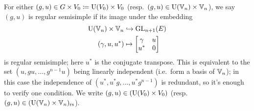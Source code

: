 \begin{definition}
\begin{itemize}
    \ii For either $(g,u) \in G \times V_0 \coloneqq \operatorname{U}(V_0) \times V_0$
    (resp.\ $(g, u) \in \operatorname{U}(\mathbb V_n) \times \mathbb V_n$),
    we say $(g, u)$
    is regular semisimple if its image under the embedding
    \begin{equation}
      \begin{aligned}
        \operatorname{U}(\mathbb V_n) \times \mathbb V_n &\hookrightarrow \operatorname{GL}_{n+1}(E) \\
        (\gamma, u, u^\ast) &\mapsto \begin{bmatrix} \gamma & u \\ u^\ast & 0 \end{bmatrix}
      \end{aligned}
      \label{eq:embed_FJ_geometric}
    \end{equation}
    is regular semisimple; here $u^\ast$ is the conjugate transpose.
    This is equivalent to the set $\left(  u, gu, \dots, g^{n-1}u \right)$
    being linearly independent (i.e.\ form a basis of $\mathbb V_n$);
    in this case the independence of $\left( u^\ast, u^\ast g, \dots, u^\ast g^{n-1} \right)$
    is redundant, so it's enough to verify one condition.
    We write $(g,u) \in (\operatorname{U}(V_0) \times V_0)$ (resp.\ $(g,u) \in (\operatorname{U}(\mathbb V_n) \times \mathbb V_n)_{\mathrm{rs}}$).
  \end{itemize}
  \label{def:regular}
\end{definition}

